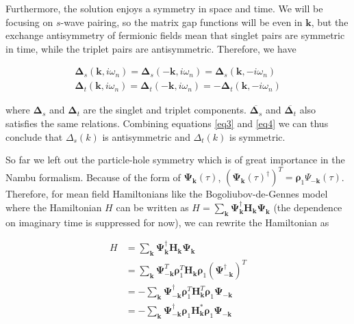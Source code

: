 \documentclass[a4paper,12pt]{article}
\begin{document}
\noindent Furthermore, the solution enjoys a symmetry in space and time. We will be focusing on $s$-wave pairing, so the matrix gap functions will be even in $\textbf{k}$, but the exchange antisymmetry of fermionic fields mean that singlet pairs are symmetric in time, while the triplet pairs are antisymmetric. Therefore, we have

\begin{equation} \label{eq4}
    \begin{split}
        \boldsymbol\Delta_{s}(\textbf{k},i\omega_{n})=\boldsymbol\Delta_{s}(-\textbf{k},i\omega_{n})=\boldsymbol\Delta_{s}(\textbf{k},-i\omega_{n}) \\
        \boldsymbol\Delta_{t}(\textbf{k},i\omega_{n})=\boldsymbol\Delta_{t}(-\textbf{k},i\omega_{n})=-\boldsymbol\Delta_{t}(\textbf{k},-i\omega_{n})
    \end{split}
\end{equation}

\noindent where $\boldsymbol\Delta_{s}$ and $\boldsymbol\Delta_{t}$ are the singlet and triplet components. $\overline{\boldsymbol\Delta_{s}}$ and $\overline{\boldsymbol\Delta_{t}}$ also satisfies the same relations. Combining equations \ref{eq3} and \ref{eq4} we can thus conclude that $\Delta_{s}(k)$ is antisymmetric and $\Delta_{t}(k)$ is symmetric.

\medskip
\noindent So far we left out the particle-hole symmetry which is of great importance in the Nambu formalism. Because of the form of $\boldsymbol\Psi_{\textbf{k}}(\tau)$, $(\boldsymbol\Psi_{\textbf{k}}(\tau)^{\dag})^{T} = \boldsymbol\rho_{1}\Psi_{-\textbf{k}}(\tau)$. Therefore, for mean field Hamiltonians like the Bogoliubov-de-Gennes model where the Hamiltonian $H$ can be written as $H=\sum_{\textbf{k}}\boldsymbol\Psi_{\textbf{k}}^{\dag}\textbf{H}_{\textbf{k}}\boldsymbol\Psi_{\textbf{k}}$ (the dependence on imaginary time is suppressed for now), we can rewrite the Hamiltonian as

\begin{equation} \label{eq5}
    \begin{split}
        H & =\sum_{\textbf{k}} \boldsymbol{\Psi}_{\textbf{k}}^{\dag}\textbf{H}_{\textbf{k}}\boldsymbol{\Psi}_{\textbf{k}} \\
        & =\sum_{\textbf{k}}\boldsymbol{\Psi}_{-\textbf{k}}^{T}\boldsymbol{\rho}_{1}^{T}\textbf{H}_{\textbf{k}}\boldsymbol{\rho}_{1}(\boldsymbol{\Psi}_{-\textbf{k}}^{\dag})^{T} \\
        & =-\sum_{\textbf{k}}\boldsymbol{\Psi}_{-\textbf{k}}^{\dag}\boldsymbol{\rho}_{1}^{T}\textbf{H}_{\textbf{k}}^{T}\boldsymbol{\rho}_{1}\boldsymbol{\Psi}_{-\textbf{k}} \\
        & =-\sum_{\textbf{k}}\boldsymbol{\Psi}_{-\textbf{k}}^{\dag}\boldsymbol{\rho}_{1}\textbf{H}_{\textbf{k}}^{\ast}\boldsymbol{\rho}_{1}\boldsymbol{\Psi}_{-\textbf{k}}
    \end{split}
\end{equation}
\end{document}
